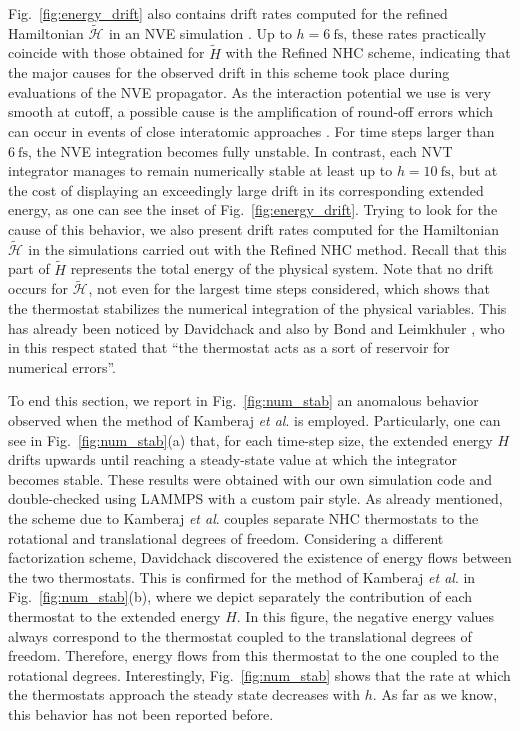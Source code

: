 \documentclass[
	aip,
	jcp,
	reprint,
]{revtex4-1}
\newcommand{\Ham}[1]{{\mathcal H}_\text{#1}}           %
\newcommand{\timestep}{h}
\newcommand{\refined}[1]{\widetilde{#1}}
\begin{document}
Fig.~\ref{fig:energy_drift} also contains drift rates computed for the refined Hamiltonian $\refined{\Ham{}}$ in an NVE simulation \cite{Silveira_2017}.
Up to $h = 6~\text{fs}$, these rates practically coincide with those obtained for $\refined H$ with the Refined NHC scheme, indicating that the major causes for the observed drift in this scheme took place during evaluations of the NVE propagator.
As the interaction potential we use is very smooth at cutoff, a possible cause is the amplification of round-off errors which can occur in events of close interatomic approaches \cite{Engle_2005}.
For time steps larger than $6~\text{fs}$, the NVE integration becomes fully unstable.
In contrast, each NVT integrator manages to remain numerically stable at least up to $h = 10~\text{fs}$, but at the cost of displaying an exceedingly large drift in its corresponding extended energy, as one can see the inset of Fig.~\ref{fig:energy_drift}.
Trying to look for the cause of this behavior, we also present drift rates computed for the Hamiltonian $\refined{\Ham{}}$ in the simulations carried out with the Refined NHC method.
Recall that this part of $\refined H$ represents the total energy of the physical system.
Note that no drift occurs for $\refined{\Ham{}}$, not even for the largest time steps considered, which shows that the thermostat stabilizes the numerical integration of the physical variables.
This has already been noticed by Davidchack \cite{Davidchack_2010} and also by Bond and Leimkhuler \cite{Bond_2007}, who in this respect stated that ``the thermostat acts as a sort of reservoir for numerical errors''.

To end this section, we report in Fig.~\ref{fig:num_stab} an anomalous behavior observed when the method of Kamberaj \textit{et al}. \cite{Kamberaj_2005} is employed.
Particularly, one can see in Fig.~\ref{fig:num_stab}(a) that, for each time-step size, the extended energy $H$ drifts upwards until reaching a steady-state value at which the integrator becomes stable.
These results were obtained with our own simulation code and double-checked using LAMMPS \cite{Plimpton_1995} with a custom pair style.
As already mentioned, the scheme due to Kamberaj \textit{et al}. \cite{Kamberaj_2005} couples separate NHC thermostats to the rotational and translational degrees of freedom.
Considering a different factorization scheme, Davidchack \cite{Davidchack_2010} discovered the existence of energy flows between the two thermostats.
This is confirmed for the method of Kamberaj \textit{et al}. \cite{Kamberaj_2005} in Fig.~\ref{fig:num_stab}(b), where we depict separately the contribution of each thermostat to the extended energy $H$.
In this figure, the negative energy values always correspond to the thermostat coupled to the translational degrees of freedom.
Therefore, energy flows from this thermostat to the one coupled to the rotational degrees.
Interestingly, Fig.~\ref{fig:num_stab} shows that the rate at which the thermostats approach the steady state decreases with $\timestep$. As far as we know, this behavior has not been reported before.
\end{document}

